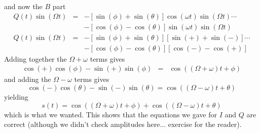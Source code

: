 \documentclass{article}
\begin{document}
 and now the $B$ part\begin{eqnarray*}
Q(t)\sin\left(\Omega t\right) & = & -\left[\sin(\phi)+\sin(\theta)\right]\cos\left(\omega t\right)\sin\left(\Omega t\right)\cdots\\
 &  & -\left[\cos(\phi)-\cos(\theta)\right]\sin\left(\omega t\right)\sin\left(\Omega t\right)\\
Q(t)\sin\left(\Omega t\right) & = & -\left[\sin(\phi)+\sin(\theta)\right]\left[\sin(+)+\sin(-)\right]\cdots\\
 &  & -\left[\cos(\phi)-\cos(\theta)\right]\left[\cos(-)-\cos(+)\right]\end{eqnarray*}
 Adding together the $\Omega+\omega$ terms gives \begin{eqnarray*}
\cos(+)\cos(\phi)-\sin(+)\sin(\phi) & = & \cos\left(\left(\Omega+\omega\right)t+\phi\right)\end{eqnarray*}
 and adding the $\Omega-\omega$ terms gives\[
\cos(-)\cos(\theta)-\sin(-)\sin(\theta)=\cos\left(\left(\Omega-\omega\right)t+\theta\right)\]
 yielding\[
s(t)=\cos\left(\left(\Omega+\omega\right)t+\phi\right)+\cos\left(\left(\Omega-\omega\right)t+\theta\right)\]
 which is what we wanted. This shows that the equations we gave for
$I$ and $Q$ are correct (although we didn't check amplitudes here...
exercise for the reader). 
\end{document}
